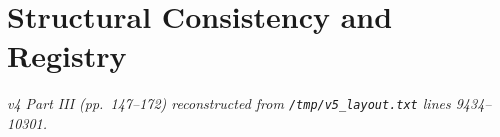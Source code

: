 \part{Structural Consistency and Registry}
\noindent\textit{v4 Part III (pp.~147--172) reconstructed from
\texttt{/tmp/v5\_layout.txt} lines 9434--10301.}












